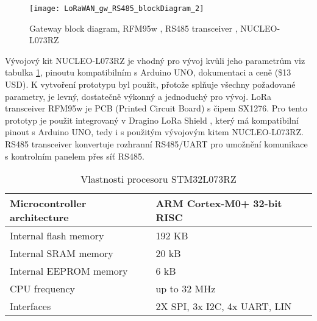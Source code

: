 \begin{figure}[!h]
    \centering
    \texttt{[image: LoRaWAN\_gw\_RS485\_blockDiagram\_2]}
    \caption{Gateway block diagram, RFM95w \cite{RFM95w}, RS485 transceiver \cite{rs485tr}, NUCLEO-L073RZ \cite{nucleoST}}
    \label{fig:gatewayBlockDiagram}
\end{figure}

Vývojový kit NUCLEO-L073RZ je vhodný pro vývoj kvůli jeho parametrům viz tabulka \ref{tab:mcuFeatures}, pinoutu kompatibilním s Arduino UNO, dokumentaci a ceně (\$13 USD\cite{nucleoST}). 
K vytvoření prototypu byl použit, přotože splňuje všechny požadované parametry, je levný, dostatečně výkonný a jednoduchý pro vývoj.
LoRa transceiver RFM95w je PCB (Printed Circuit Board) s čipem SX1276. Pro tento prototyp je použit integrovaný v Dragino LoRa Shield \cite{draginoWiki}, který má kompatibilní pinout s Arduino UNO, tedy i s použitým vývojovým kitem NUCLEO-L073RZ.
RS485 transceiver konvertuje rozhranní RS485/UART pro umožnění komunikace s kontrolním panelem přes síť RS485.

\begin{table}[h]
\centering
\footnotesize
\caption{Vlastnosti procesoru STM32L073RZ \cite{nucleoST}}
\begin{ctucolortab}
\begin{tabular}{|l|p{3.5cm}|}
\hline
Microcontroller architecture & ARM Cortex-M0+ 32-bit RISC \\ \hline
Internal flash memory & 192 KB \\ \hline
Internal SRAM memory & 20 kB \\ \hline
Internal EEPROM memory & 6 kB \\ \hline
CPU frequency & up to 32 MHz \\ \hline
Interfaces & 2X SPI, 3x I2C, 4x UART, LIN \\ \hline
\end{tabular}
\end{ctucolortab}
\label{tab:mcuFeatures}
\end{table}



